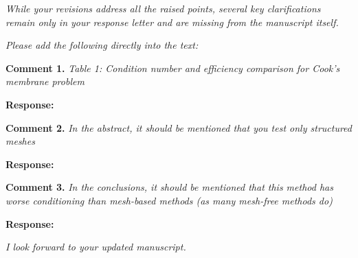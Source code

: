 \documentclass{article}
\begin{document}
\textit{While your revisions address all the raised points, several key clarifications remain only in your response letter and are missing from the manuscript itself.}

\textit{Please add the following directly into the text:}

\textbf{Comment 1.} \textit{ Table 1: Condition number and eﬀiciency comparison for Cook's membrane problem}

\textbf{Response:}

\textbf{Comment 2.} \textit{ In the abstract, it should be mentioned that you test only structured meshes}

\textbf{Response:} 

\textbf{Comment 3.} \textit{In the conclusions, it should be mentioned that this method has worse conditioning than mesh-based methods (as many mesh-free methods do)}

\textbf{Response:}

\textit{I look forward to your updated manuscript.}


% 
\end{document}
